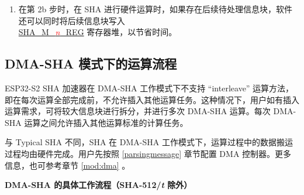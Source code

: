 \documentclass[main\_\_CN.tex]{subfiles}
\begin{document}
\begin{tiplisting}\label{note1}
\vspace{-2.5em}
\begin{enumerate}
\item 在第 2b 步时，在 SHA 进行硬件运算时，如果存在后续待处理信息块，软件还可以同时将后续信息块写入 \\ \hyperref[regdesc:SHAMNREG]{SHA\_M\_\textcolor{red}{\it{n}}\_REG} 寄存器堆，以节省时间。
\end{enumerate}
\end{tiplisting}


\subsection{DMA-SHA 模式下的运算流程}\label{subsection:dma-sha}

ESP32-S2 SHA 加速器在 DMA-SHA 工作模式下不支持 “interleave” 运算方法，即在每次运算全部完成前，不允许插入其他运算任务。这种情况下，用户如有插入运算需求，可将较大信息块进行拆分，并进行多次 DMA-SHA 运算。每次 DMA-SHA 运算之间允许插入其他运算标准的计算任务。

与 Typical SHA 不同，SHA 在 DMA-SHA 工作模式下，运算过程中的数据搬运过程均由硬件完成。用户先按照 \ref{parsingmessage} 章节配置 DMA 控制器。更多信息，也可参考章节 \ref{mod:dma} \textit{}。

\textbf{DMA-SHA 的具体工作流程（SHA-512/{\it{t}} 除外）}
\end{document}
